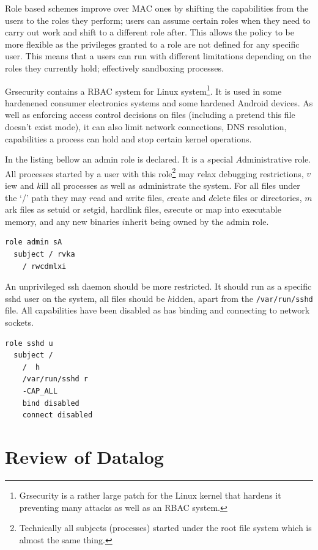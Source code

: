 \documentclass[a4paper,sfsidenotes]{%
  article%
}
\begin{document}
Role based schemes
improve over \ac{MAC} ones by shifting the capabilities from the users to the
roles they perform; users can assume certain roles when they need to carry out
work and shift to a different role after.  This allows the policy to be more
flexible as the privileges granted to a role are not defined for any specific
user.  This means that a users can run with different limitations
depending on the roles they currently hold; effectively sandboxing processes.

Grsecurity contains a \ac{RBAC} system for Linux system\footnote{Grsecurity is
  a rather large patch for the Linux kernel that hardens it preventing many
  attacks as well as an \ac{RBAC} system.}.  It is used in some hardenened consumer
electronics systems and some hardened Android devices.  As well as enforcing
access control decisions on files (including a pretend this file doesn't exist
mode), it can also limit network connections, DNS
resolution, capabilities a process can hold and stop certain kernel operations.

In the listing bellow an admin role is declared.  It is a $s$pecial
$A$dministrative role.  All processes started by a user with this
role\footnote{Technically all subjects (processes) started under the root file
  system which is almost the same thing.} may $r$elax debugging restrictions,
  $v$iew and $k$ill all processes as well as $a$dministrate the system.
For all files under the `/' path they may $r$ead and $w$rite files, $c$reate and
$d$elete files or directories, $m$ark files as setuid or setgid, hardlink files,
e$x$ecute or map into executable memory, and any new binaries $i$nherit being
owned by the admin role.

\begin{lstlisting}[language=grsec]
role admin sA
  subject / rvka 
    / rwcdmlxi
\end{lstlisting}

An unprivileged ssh daemon should be more restricted.  It should run as a
specific sshd $u$ser on the system, all files should be $h$idden, apart from the
\texttt{/var/run/sshd} file.  All capabilities have been disabled as has binding
and connecting to network sockets.

\begin{lstlisting}[language=grsec]
role sshd u
  subject /
    /  h
    /var/run/sshd r
    -CAP_ALL
    bind disabled
    connect disabled
\end{lstlisting}

\section{Review of Datalog}
\label{sec:datalog}
\end{document}
